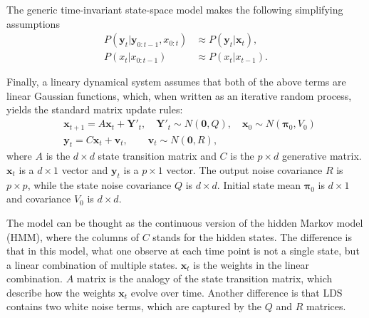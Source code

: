 \documentclass[fleqn]{article}
\providecommand{\mb}[1]{\boldsymbol{#1}}
\newcommand{\bx}{\mb{x}}
\newcommand{\by}{\mb{y}}
\newcommand{\bX}{\mb{X}}
\newcommand{\bY}{\mb{Y}}
\begin{document}
The generic time-invariant state-space model makes the following simplifying assumptions 
\begin{equation}
\begin{aligned}
P(\by_t | \by_{0:t-1}, x_{0:t})  &\approx P(\by_t | \bx_t), \\
P(x_t | x_{0:t-1}) &\approx P(x_t | x_{t-1}).
\end{aligned}
\end{equation}

Finally, a lineary dynamical system assumes that both of the above terms are linear Gaussian functions, which, when written as an iterative random process, yields the standard matrix update rules:
\begin{equation} \label{eq:model}
\begin{aligned}
&\bx_{t+1}=A\bx_t+\bY'_t, \quad \bY'_t\sim N(\mathbf{0},Q),\quad \bx_0 \sim N(\mathbf{\pi}_0,V_0)\\
&\by_t=C\bx_t+\mathbf{v}_t,\qquad \mathbf{v}_t\sim N(\mathbf{0},R),
\end{aligned}
\end{equation}
where $A$ is the $d\times d$ state transition matrix and $C$ is the $p \times d$ generative matrix. $\bx_t$ is a $d\times 1$ vector and $\by_t$ is a $p\times 1$ vector. 
The output noise covariance $R$ is $p\times p$, while the state noise covariance $Q$ is $d\times d$. Initial state mean $\mathbf{\pi}_0$ is $d\times 1$ and covariance $V_0$ is $d \times d$.

The model can be thought as the continuous version of the hidden Markov model (HMM), where the columns of $C$ stands for the hidden states. The difference is that in this model, what one observe at each time point is not a single state, but a linear combination of multiple states. $\bx_t$ is the weights in the linear combination. $A$ matrix is the analogy of the state transition matrix, which describe how the weights $\bx_t$ evolve over time. Another difference is that LDS contains two white noise terms, which are captured by the $Q$ and $R$ matrices.
\end{document}
